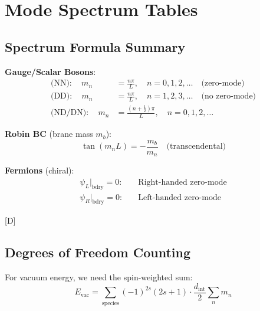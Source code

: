 \documentclass[11pt,a4paper]{article}
\newcommand{\tagD}{\textcolor{blue!70!black}{[D]}}
\begin{document}
\section{Mode Spectrum Tables}

\subsection{Spectrum Formula Summary}

\begin{resultbox}
\textbf{Gauge/Scalar Bosons}:
\begin{align}
\label{eq:spec-NN-full}
\text{(NN)}: \quad m_n &= \frac{n\pi}{L}, \quad n = 0, 1, 2, \ldots \quad \text{(zero-mode)} \\
\label{eq:spec-DD-full}
\text{(DD)}: \quad m_n &= \frac{n\pi}{L}, \quad n = 1, 2, 3, \ldots \quad \text{(no zero-mode)} \\
\label{eq:spec-ND-full}
\text{(ND/DN)}: \quad m_n &= \frac{(n+\tfrac{1}{2})\pi}{L}, \quad n = 0, 1, 2, \ldots
\end{align}

\textbf{Robin BC} (brane mass $m_b$):
\begin{equation}
\label{eq:spec-Robin}
\tan(m_n L) = -\frac{m_b}{m_n} \quad \text{(transcendental)}
\end{equation}

\textbf{Fermions} (chiral):
\begin{align}
\label{eq:spec-ferm-L}
\psi_L|_{\text{bdry}} = 0: \quad & \text{Right-handed zero-mode} \\
\label{eq:spec-ferm-R}
\psi_R|_{\text{bdry}} = 0: \quad & \text{Left-handed zero-mode}
\end{align}

\tagD
\end{resultbox}

\subsection{Degrees of Freedom Counting}

For vacuum energy, we need the spin-weighted sum:
\begin{equation}
\label{eq:dof-sum}
E_{\text{vac}} = \sum_{\text{species}} (-1)^{2s} (2s+1) \cdot \frac{d_{\text{int}}}{2} \sum_n m_n
\end{equation}
\end{document}
